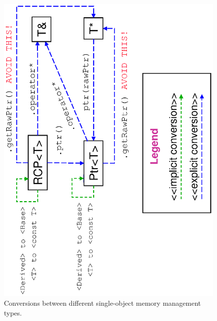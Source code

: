 \documentclass[pdf,ps2pdf,11pt]{SANDreport}
\begin{document}
{\bsinglespace
\begin{figure}
\begin{center}
\includegraphics*[angle=270,scale=0.65]{TeuchosPtrConversions}
\end{center}
\caption{
\label{fig:TeuchosPtrConversions}
Conversions between different single-object memory management types.}
\end{figure}
\esinglespace}
\end{document}
